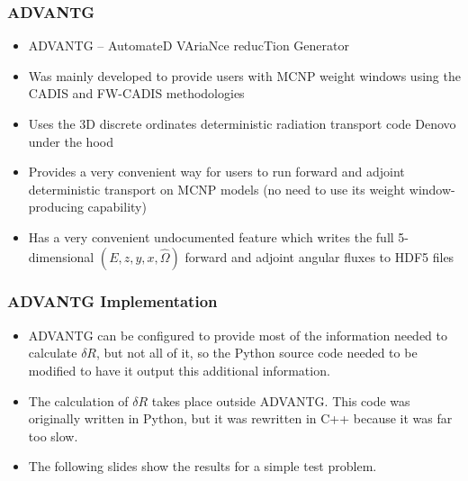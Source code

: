 \documentclass[t]{beamer}
\begin{document}
\begin{frame}
  \frametitle{ADVANTG}
  \begin{itemize}
    \item ADVANTG -- AutomateD VAriaNce reducTion Generator
    \item Was mainly developed to provide users with MCNP weight windows using
          the CADIS and FW-CADIS methodologies
    \item Uses the 3D discrete ordinates deterministic radiation transport code
          Denovo under the hood
    \item Provides a very convenient way for users to run forward and adjoint
          deterministic transport on MCNP models (no need to use its weight
          window-producing capability)
    \item Has a very convenient undocumented feature which writes the full
          5-dimensional $(E,z,y,x,\hat{\Omega})$ forward and adjoint angular
          fluxes to HDF5 files
  \end{itemize}
\end{frame}

\begin{frame}
  \frametitle{ADVANTG Implementation}
  \begin{itemize}
    \item ADVANTG can be configured to provide most of the information needed to
          calculate $\delta R$, but not all of it, so the Python source code
          needed to be modified to have it output this additional information.
    \item The calculation of $\delta R$ takes place outside ADVANTG. This code
          was originally written in Python, but it was rewritten in C++ because
          it was far too slow.
    \item The following slides show the results for a simple test problem.
  \end{itemize}
\end{frame}

\end{document}
